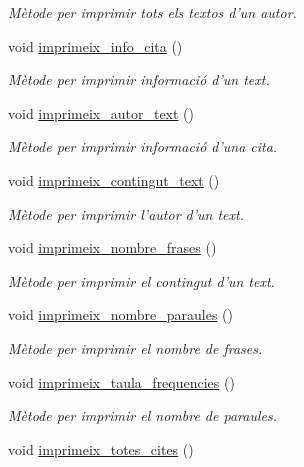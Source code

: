 \begin{DoxyCompactItemize}
\begin{DoxyCompactList}\small\item\em Mètode per imprimir tots els textos d'un autor. \end{DoxyCompactList}\item 
void \hyperlink{class_cjt__autors_a84d76f9c9487d5f36c10a6a5b3739de3}{imprimeix\+\_\+info\+\_\+cita} ()
\begin{DoxyCompactList}\small\item\em Mètode per imprimir informació d'un text. \end{DoxyCompactList}\item 
void \hyperlink{class_cjt__autors_a583a23dac0ab39f588aae1df306b7dc3}{imprimeix\+\_\+autor\+\_\+text} ()
\begin{DoxyCompactList}\small\item\em Mètode per imprimir informació d'una cita. \end{DoxyCompactList}\item 
void \hyperlink{class_cjt__autors_a56fbd0fb78bf29adc6525c9d2a6ae117}{imprimeix\+\_\+contingut\+\_\+text} ()
\begin{DoxyCompactList}\small\item\em Mètode per imprimir l'autor d'un text. \end{DoxyCompactList}\item 
void \hyperlink{class_cjt__autors_ad6a8a06f8a706808a133d0c11c579656}{imprimeix\+\_\+nombre\+\_\+frases} ()
\begin{DoxyCompactList}\small\item\em Mètode per imprimir el contingut d'un text. \end{DoxyCompactList}\item 
void \hyperlink{class_cjt__autors_a63c6fd83a2ce3a2bd150237fe9619f8c}{imprimeix\+\_\+nombre\+\_\+paraules} ()
\begin{DoxyCompactList}\small\item\em Mètode per imprimir el nombre de frases. \end{DoxyCompactList}\item 
void \hyperlink{class_cjt__autors_a90b657e80e6cb212a7cbf0f8c05e69d0}{imprimeix\+\_\+taula\+\_\+frequencies} ()
\begin{DoxyCompactList}\small\item\em Mètode per imprimir el nombre de paraules. \end{DoxyCompactList}\item 
void \hyperlink{class_cjt__autors_a388318c22b9aef045e8f6646cfc3b638}{imprimeix\+\_\+totes\+\_\+cites} ()

\end{DoxyCompactItemize}
